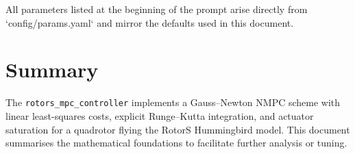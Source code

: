 \documentclass[11pt,a4paper]{article}
\begin{document}
All parameters listed at the beginning of the prompt arise directly from `config/params.yaml` and mirror the defaults used in this document.

\section{Summary}

The \texttt{rotors\_mpc\_controller} implements a Gauss--Newton NMPC scheme with linear least-squares costs, explicit Runge--Kutta integration, and actuator saturation for a quadrotor flying the RotorS Hummingbird model. This document summarises the mathematical foundations to facilitate further analysis or tuning.
\end{document}
